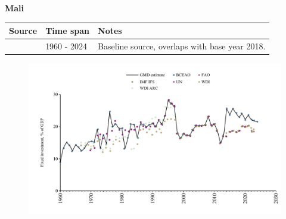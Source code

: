 \documentclass[12pt,a4paper,landscape]{article}
\begin{document}
\begin{adjustbox}{max totalsize={\paperwidth}{\paperheight},center}
\begin{minipage}[t][\textheight][t]{\textwidth}
\vspace*{0.5cm}
{}
\begin{center}
{\Large\bfseries Mali}
\end{center}
\vspace{0.5cm}
\begin{table}[H]
\centering
\small
\begin{tabular}{|l|l|l|}
\hline
\textbf{Source} & \textbf{Time span} & \textbf{Notes} \\
\hline
\rowcolor{white}\cite{BCEAO}& 1960 - 2024 &Baseline source, overlaps with base year 2018.\\
\hline
\end{tabular}
\end{table}
\begin{figure}[H]
\centering
\includegraphics[width=\textwidth,height=0.6\textheight,keepaspectratio]{graphs/MLI_finv_GDP.pdf}
\end{figure}
\end{minipage}
\end{adjustbox}
\end{document}
